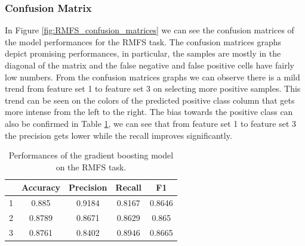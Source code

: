 \documentclass[../../Thesis.tex]{subfiles}
\begin{document}
			\subsubsection{Confusion Matrix}
				In Figure \ref{fig:RMFS_confusion_matrices} we can see the confusion matrices of the model performances for the RMFS task. The confusion matrices graphs depict promising performances, in particular, the samples are mostly in the diagonal of the matrix and the false negative and false positive cells have fairly low numbers. From the confusion matrices graphs we can observe there is a mild trend from feature set 1 to feature set 3 on selecting more positive samples.  This trend can be seen on the colors of the predicted positive class column that gets more intense from the left to the right. The bias towards the positive class can also be confirmed in Table \ref{tab:RMFS_gboost_perf_values}, we can see that from feature set 1 to feature set 3 the precision gets lower while the recall improves significantly. 
				\begin{table}
					\center
					\setlength\tabcolsep{0.5em}
					\begin{tabular}{|ccccc|}
						\hline
						\rowcolor{bluepoli!40}
						\multicolumn{1}{|c}{\textbf{Feature Set}} &  \textbf{Accuracy} & \textbf{Precision} & \textbf{Recall} & \textbf{F1}\\ 
						\hline
						1 & 0.885 & 0.9184 & 0.8167 & 0.8646\\
						\hline
						2 & 0.8789 & 0.8671 & 0.8629 & 0.865 \\
						\hline
						3 & 0.8761 & 0.8402 & 0.8946 & 0.8665 \\
						\hline
					\end{tabular}
					\caption{Performances of the gradient boosting model on the RMFS task.}
					\label{tab:RMFS_gboost_perf_values}
				\end{table}
\end{document}
